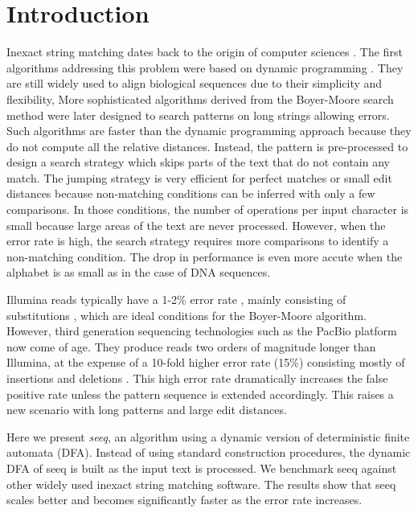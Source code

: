 \documentclass{bioinfo}
\begin{document}
\section{Introduction}

Inexact string matching dates back to the origin of computer sciences
\citep{Lev65}. The first algorithms addressing this problem were based
on dynamic programming \citep{NW70}. They are still widely used to
align biological sequences due to their simplicity and flexibility,
More sophisticated algorithms derived from the Boyer-Moore search
method \citep{BM77} were later designed to search patterns on long
strings allowing errors. Such algorithms are faster than the dynamic
programming approach because they do not compute all the relative
distances. Instead, the pattern is pre-processed to design a search
strategy which skips parts of the text that do not contain any
match. The jumping strategy is very efficient for perfect matches or
small edit distances because non-matching conditions can be inferred
with only a few comparisons. In those conditions, the number of
operations per input character is small because large areas of the
text are never processed. However, when the error rate is high, the
search strategy requires more comparisons to identify a non-matching
condition. The drop in performance is even more accute when the alphabet
is as small as in the case of DNA sequences.

Illumina reads typically have a 1-2\% error rate \citep{Mar05},
mainly consisting of substitutions \citep{Doh08}, which are ideal
conditions for the Boyer-Moore algorithm. However, third generation
sequencing technologies such as the PacBio platform now come of age.
They produce reads two orders of magnitude longer than Illumina, at
the expense of a 10-fold higher error rate (15\%) consisting mostly
of insertions and deletions \citep{Eid09}.  
This high error rate dramatically increases the false
positive rate unless the pattern sequence is extended
accordingly. This raises a new scenario with long patterns and
large edit distances.

Here we present \emph{seeq}, an algorithm using a dynamic version of
deterministic finite automata (DFA). Instead of using standard
construction procedures, the dynamic DFA of seeq is built as the input
text is processed. We benchmark seeq against other widely used inexact
string matching software. The results show that seeq scales better and
becomes significantly faster as the error rate increases.
\end{document}
